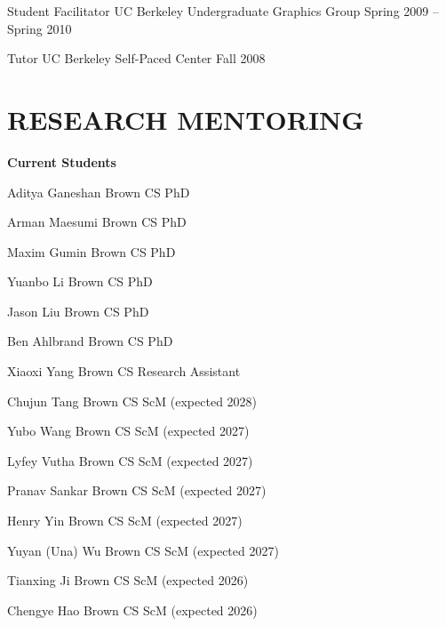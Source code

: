 \documentclass[line,margin]{res}
\begin{document}
\begin{resume}
\teach
{Student Facilitator}
{UC Berkeley Undergraduate Graphics Group}
{Spring 2009 -- Spring 2010}

\teach
{Tutor}
{UC Berkeley Self-Paced Center}
{Fall 2008}


\section{RESEARCH MENTORING}

\newcommand{\currentphd}[2] {
	#1 \hfill #2
}

\newcommand{\student}[3] {
	#1 \hfill #2 (expected #3)
}

\newcommand{\alumni}[4] {
	#1 \hfill #2 #3\\
	\emph{Next position: #4}
}

\newcommand{\visitor}[4] {
	#1 \hfill #2 #3\\
	\emph{Home institution: #4}
}

\newcommand{\thesiscomm}[3] {
	#1 \hfill #2\\
	\emph{#3}
}


\textbf{Current Students}

\currentphd
{Aditya Ganeshan}
{Brown CS PhD}

\currentphd
{Arman Maesumi}
{Brown CS PhD}

\currentphd
{Maxim Gumin}
{Brown CS PhD}

\currentphd
{Yuanbo Li}
{Brown CS PhD}

\currentphd
{Jason Liu}
{Brown CS PhD}

\currentphd
{Ben Ahlbrand}
{Brown CS PhD}

\currentphd
{Xiaoxi Yang}
{Brown CS Research Assistant}

\student
{Chujun Tang}
{Brown CS ScM}
{2028}

\student
{Yubo Wang}
{Brown CS ScM}
{2027}

\student
{Lyfey Vutha}
{Brown CS ScM}
{2027}

\student
{Pranav Sankar}
{Brown CS ScM}
{2027}

\student
{Henry Yin}
{Brown CS ScM}
{2027}

\student
{Yuyan (Una) Wu}
{Brown CS ScM}
{2027}

\student
{Tianxing Ji}
{Brown CS ScM}
{2026}

\student
{Chengye Hao}
{Brown CS ScM}
{2026}



\end{resume}
\end{document}

